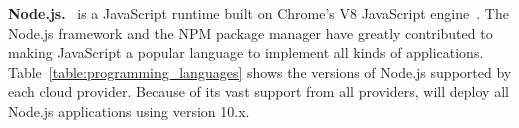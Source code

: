 \textbf{Node.js.}~\cite{tilkov2010node} is a JavaScript runtime built on Chrome's V8 JavaScript engine~\cite{Nodejs}. 
The Node.js framework and the \gls{NPM} package manager have greatly contributed to making JavaScript a popular language to implement all kinds of applications.
Table~\ref{table:programming_languages} shows the versions of Node.js supported by each cloud provider. 
Because of its vast support from all providers, \sys will deploy all Node.js applications using version 10.x.
